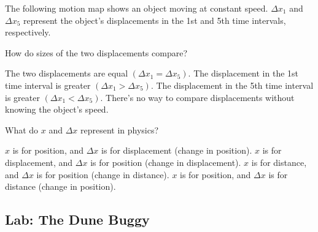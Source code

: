\documentclass[]{exam}
\begin{document}
\begin{questions}
\question
The following motion map shows an object moving at constant speed. $\Delta x_1$ and $\Delta x_5$ represent the object's displacements in the 1st and 5th time intervals, respectively.

\begin{center}
\end{center}

How do sizes of the two displacements compare?

\begin{randomizechoices}[keeplast]
    \correctchoice The two displacements are equal $\left(\Delta x_1 = \Delta x_5\right)$.
    \choice The displacement in the 1st time interval is greater $\left(\Delta x_1 > \Delta x_5\right)$.
    \choice The displacement in the 5th time interval is greater $\left(\Delta x_1 < \Delta x_5\right)$.
    \choice There's no way to compare displacements without knowing the object's speed.
\end{randomizechoices}

\question
What do $x$ and $\Delta x$ represent in physics?

\begin{randomizechoices}
    \correctchoice $x$ is for position, and $\Delta x$ is for displacement (change in position).
    \choice $x$ is for displacement, and $\Delta x$ is for position (change in displacement).
    \choice $x$ is for distance, and $\Delta x$ is for position (change in distance).
    \choice $x$ is for position, and $\Delta x$ is for distance (change in position).
\end{randomizechoices}

\end{questions}

\clearpage

\subsection*{Lab: The Dune Buggy}
\end{document}
